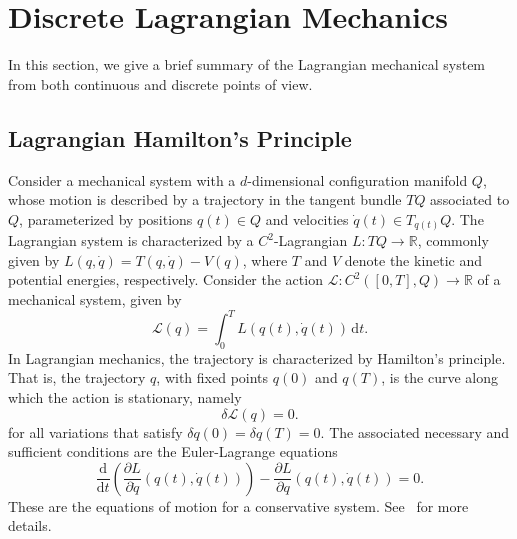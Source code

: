 \documentclass[a4paper,10pt,reqno]{amsart}
\theoremstyle{definition}
\newcommand{\lp}{\left(}
\newcommand{\rp}{\right)}
\newcommand{\der}{\partial}
\newcommand{\R}{\mathbb{R}}      %
\newcommand{\Flder}{\rightarrow}
\newcommand{\dd}{\mathrm{d}}
\begin{document}
\section{Discrete Lagrangian Mechanics}\label{Disc_Lag_Mech}

In this section, we give a brief summary of the Lagrangian mechanical system from both continuous and  discrete points of view. 

\subsection{Lagrangian Hamilton's Principle}
Consider a mechanical system with a $d$-dimensional configuration manifold $Q$, whose motion is described by a trajectory in the tangent bundle $TQ$ associated to $Q$, parameterized by positions 
$q(t)\in Q$ and   velocities  $\dot q(t)\in T_{q(t)}Q$. The Lagrangian system is characterized by a $C^2$-Lagrangian $L:TQ\Flder\R$, commonly given by  $L(q,\dot q)=T(q,\dot q)-V(q)$, where  $T$ and $V$ denote the kinetic and potential energies, respectively. Consider 
the action $\mathcal{L}:C^2([0,T],Q)\Flder\R$ of a mechanical system, given by
\begin{equation}\label{ContAc}
\mathcal{L}(q)=\int_0^TL(q(t),\dot q(t))\,\dd t.
\end{equation}
In Lagrangian mechanics, the trajectory is characterized by Hamilton's principle.  That is, the trajectory $q$, with fixed points $q(0)$ and $q(T)$, is the curve along which the action is stationary, namely
\[
\delta\mathcal{L}(q)=0.
\]
for all variations that satisfy $\delta q(0)=\delta q(T)=0$. The associated necessary and sufficient conditions are the Euler-Lagrange  equations
\begin{equation}\label{EL}
\frac{\dd}{\dd t}\lp\frac{\der L}{\der\dot q}(q(t),\dot q(t))\rp-\frac{\der L}{\der q}(q(t),\dot q(t))=0.
\end{equation}
These are the equations of motion for a conservative system. See~\cite{AbMa,MaWe,MarRat} for more details.
\end{document}
